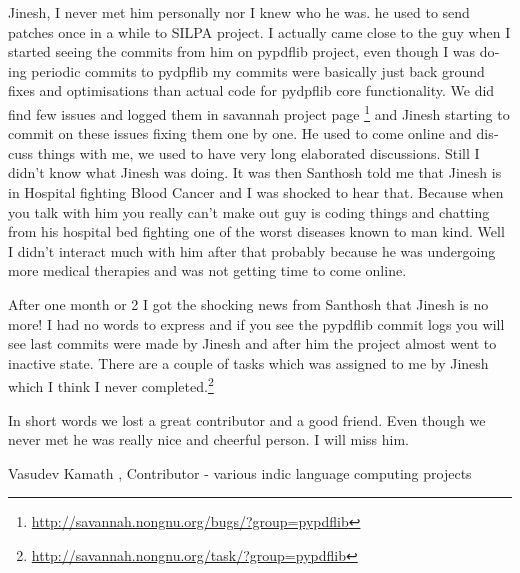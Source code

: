 \begin{english}

Jinesh, I never met him personally nor I knew who he was. he used to
send patches once in a while to SILPA project. I actually came close
to the guy when I started seeing the commits from him on pypdflib
project, even though I was doing periodic commits to pydpflib my
commits were basically just back ground fixes and optimisations than
actual code for pydpflib core functionality. We did find few issues
and logged them in savannah project page \footnote{\url{http://savannah.nongnu.org/bugs/?group=pypdflib}} and Jinesh starting to
commit on these issues fixing them one by one. He used to come online
and discuss things with me, we used to have very long elaborated
discussions. Still I didn't know what Jinesh was doing. It was then
Santhosh told me that Jinesh is in Hospital fighting Blood Cancer and
I was shocked to hear that. Because when you talk with him you really
can't make out guy is coding things and chatting from his hospital bed
fighting one of the worst diseases known to man kind. Well I didn't
interact much with him after that probably because he was undergoing
more medical therapies and was not getting time to come online.

After one month or 2 I got the shocking news from Santhosh that Jinesh
is no more! I had no words to express and if you see the pypdflib
commit logs you will see last commits were made by Jinesh and after
him the project almost went to inactive state. There are a couple of
tasks which was assigned to me by Jinesh which I think I never
completed.\footnote{\url{http://savannah.nongnu.org/task/?group=pypdflib}}

In short words we lost a great contributor and a good friend. Even
though we never met he was really nice and cheerful person. I will
miss him.

Vasudev Kamath , Contributor - various indic language computing projects
 \end{english}
 \newpage
